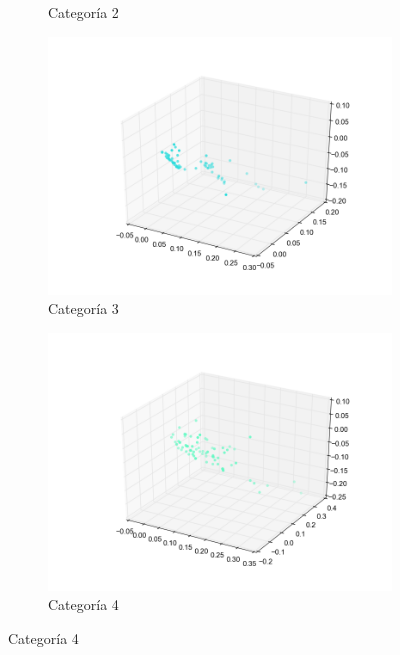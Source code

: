 \begin{figure}[H]
\begin{subfigure}[b]{0.33\textwidth}
                \caption{Categoría 2}
                \label{fig: ej1_oja_categoria_2}
        \end{subfigure}
        \begin{subfigure}[b]{0.33\textwidth}
                \includegraphics[width=\linewidth]{secciones/graficos/oja/categoria_3.png}
                \caption{Categoría 3}
                \label{fig: ej1_oja_categoria_4}
        \end{subfigure}
        \begin{subfigure}[b]{0.33\textwidth}
                \includegraphics[width=\linewidth]{secciones/graficos/oja/categoria_4.png}
                \caption{Categoría 4}
                \label{fig: ej1_oja_categoria_4}

\end{subfigure}
\end{figure}
